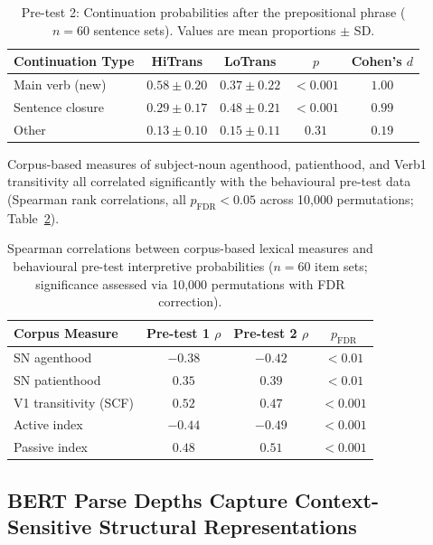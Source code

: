 \documentclass[11pt]{article}
\begin{document}
\begin{table}[H]
\centering
\caption{Pre-test 2: Continuation probabilities after the prepositional phrase ($n = 60$ sentence sets). Values are mean proportions $\pm$ SD.}
\label{tab:pretest2}
\begin{tabular}{lcccc}
\toprule
Continuation Type & HiTrans & LoTrans & $p$ & Cohen's $d$ \\
\midrule
Main verb (new) & $0.58 \pm 0.20$ & $0.37 \pm 0.22$ & $< 0.001$ & $1.00$ \\
Sentence closure & $0.29 \pm 0.17$ & $0.48 \pm 0.21$ & $< 0.001$ & $0.99$ \\
Other & $0.13 \pm 0.10$ & $0.15 \pm 0.11$ & $0.31$ & $0.19$ \\
\bottomrule
\end{tabular}
\end{table}

Corpus-based measures of subject-noun agenthood, patienthood, and Verb1 transitivity all correlated significantly with the behavioural pre-test data (Spearman rank correlations, all $p_{\mathrm{FDR}} < 0.05$ across 10,000 permutations; Table~\ref{tab:corpus_behav}).

\begin{table}[H]
\centering
\caption{Spearman correlations between corpus-based lexical measures and behavioural pre-test interpretive probabilities ($n = 60$ item sets; significance assessed via 10,000 permutations with FDR correction).}
\label{tab:corpus_behav}
\begin{tabular}{lccc}
\toprule
Corpus Measure & Pre-test 1 $\rho$ & Pre-test 2 $\rho$ & $p_{\mathrm{FDR}}$ \\
\midrule
SN agenthood & $-0.38$ & $-0.42$ & $< 0.01$ \\
SN patienthood & $0.35$ & $0.39$ & $< 0.01$ \\
V1 transitivity (SCF) & $0.52$ & $0.47$ & $< 0.001$ \\
Active index & $-0.44$ & $-0.49$ & $< 0.001$ \\
Passive index & $0.48$ & $0.51$ & $< 0.001$ \\
\bottomrule
\end{tabular}
\end{table}

\subsection{BERT Parse Depths Capture Context-Sensitive Structural Representations}
\end{document}
